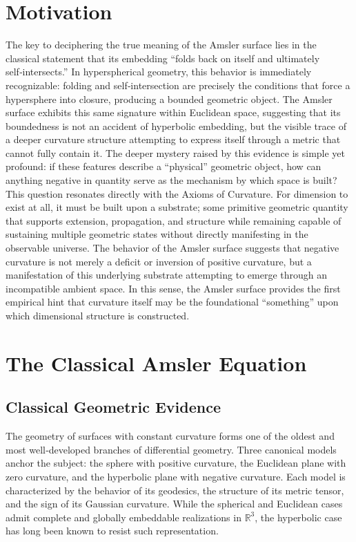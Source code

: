 \documentclass[final,onefignum,onetabnum]{siamart}
\begin{document}
\section{Motivation}

The key to deciphering the true meaning of the Amsler surface lies in the classical statement that its embedding “folds back on itself and ultimately self‑intersects.” In hyperspherical geometry, this behavior is immediately recognizable: folding and self‑intersection are precisely the conditions that force a hypersphere into closure, producing a bounded geometric object. The Amsler surface exhibits this same signature within Euclidean space, suggesting that its boundedness is not an accident of hyperbolic embedding, but the visible trace of a deeper curvature structure attempting to express itself through a metric that cannot fully contain it. The deeper mystery raised by this evidence is simple yet profound: if these features describe a “physical” geometric object, how can anything negative in quantity serve as the mechanism by which space is built? This question resonates directly with the Axioms of Curvature. For dimension to exist at all, it must be built upon a substrate; some primitive geometric quantity that supports extension, propagation, and structure while remaining capable of sustaining multiple geometric states without directly manifesting in the observable universe. The behavior of the Amsler surface suggests that negative curvature is not merely a deficit or inversion of positive curvature, but a manifestation of this underlying substrate attempting to emerge through an incompatible ambient space. In this sense, the Amsler surface provides the first empirical hint that curvature itself may be the foundational “something” upon which dimensional structure is constructed.

\section{The Classical Amsler Equation}

\subsection{Classical Geometric Evidence}

The geometry of surfaces with constant curvature forms one of the oldest and most well‑developed branches of differential geometry. Three canonical models anchor the subject: the sphere with positive curvature, the Euclidean plane with zero curvature, and the hyperbolic plane with negative curvature. Each model is characterized by the behavior of its geodesics, the structure of its metric tensor, and the sign of its Gaussian curvature. While the spherical and Euclidean cases admit complete and globally embeddable realizations in $\mathbb{R}^3$, the hyperbolic case has long been known to resist such representation.
\end{document}
